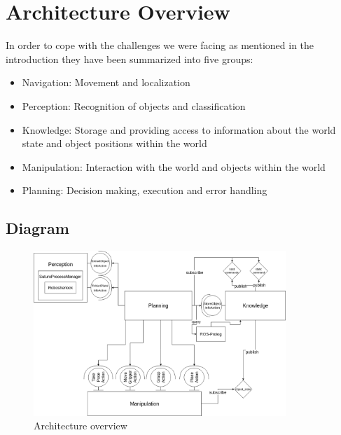 \documentclass[main.tex]{subfiles}
\begin{document}
	\begingroup

	\renewcommand{\cleardoublepage}{}

	\renewcommand{\clearpage}{}

	\chapter{Architecture Overview}
		In order to cope with the challenges we were facing as mentioned in the introduction they have been summarized into five groups:

		\begin{itemize}
			\item Navigation: Movement and localization
			\item Perception: Recognition of objects and classification
			\item Knowledge: Storage and providing access to information about the world state and object positions within the world
			\item Manipulation: Interaction with the world and objects within the world
			\item Planning: Decision making, execution and error handling
		\end{itemize}


		\chapterauthor{}
		
		\section{Diagram}
		
		\begin{figure}[h]
			\centering
			\includegraphics[width=0.85\textwidth]{pictures/diagramms/architecture.png}
			\caption{Architecture overview}
			\label{architecture}
		\end{figure}
		
\end{document}
